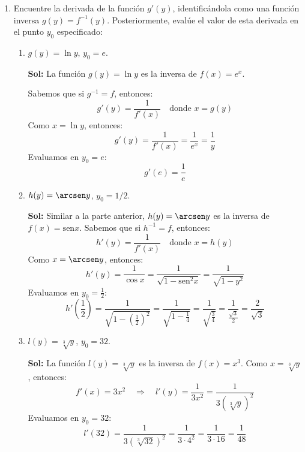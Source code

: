 \documentclass[letterpaper,12pt]{article}
\theoremstyle{plain}
\theoremstyle{definition}
\newcommand{\sen}{\text{sen}}
\begin{document}
\vspace{0.3cm}
\begin{enumerate}

\item Encuentre la derivada de la funci\'on $g'(y)$, identific\'andola como una funci\'on inversa $g(y) = f^{-1}(y)$. Posteriormente, eval\'ue el valor de esta derivada en el punto $y_0$ especificado:
\begin{enumerate}
    \item $g(y) = \ln y$, $y_0 = e$.

\color{blue}
\textbf{Sol:} La función $g(y) = \ln y$ es la inversa de $f(x) = e^x$.

    Sabemos que si $g^{-1} = f$, entonces:
    \[
    g'(y) = \frac{1}{f'(x)} \quad \text{donde } x = g(y)
    \]
    Como $x = \ln y$, entonces:
    \[
    g'(y) = \frac{1}{f'(x)} = \frac{1}{e^x} = \frac{1}{y}
    \]
    Evaluamos en $y_0 = e$:
    \[
    g'(e) = \frac{1}{e}
    \]
\color{black}
    \item $h(y) = \arcsen y$, $y_0 = 1/2$.

\color{blue}
\textbf{Sol:} Similar a la parte anterior, $h(y) = \arcsen y$ es la inversa de $f(x) = \sen x$. Sabemos que si $h^{-1} = f$, entonces:
\[
h'(y) = \frac{1}{f'(x)} \quad \text{donde } x = h(y)
\]
Como $x = \arcsen y$, entonces:
\[
h'(y) = \frac{1}{\cos x} = \frac{1}{\sqrt{1 - \sen^2 x}} = \frac{1}{\sqrt{1 - y^2}}
\]
Evaluamos en $y_0 = \frac{1}{2}$:
\[
h'\left( \frac{1}{2} \right) = \frac{1}{\sqrt{1 - \left( \frac{1}{2} \right)^2}} = \frac{1}{\sqrt{1 - \frac{1}{4}}} = \frac{1}{\sqrt{\frac{3}{4}}} = \frac{1}{\frac{\sqrt{3}}{2}} = \frac{2}{\sqrt{3}}
\]
\color{black}
    
    \item $l(y) = \sqrt[3]{y}$, $y_0 = 32$.

\color{blue}
\textbf{Sol:}
La función $l(y) = \sqrt[3]{y}$ es la inversa de $f(x) = x^3$. Como $x = \sqrt[3]{y}$, entonces:
\[
f'(x) = 3x^2 \quad \Rightarrow \quad l'(y) = \frac{1}{3x^2} = \frac{1}{3 (\sqrt[3]{y})^2}
\]
Evaluamos en $y_0 = 32$:
\[
l'(32) = \frac{1}{3 (\sqrt[3]{32})^2} = \frac{1}{3 \cdot 4^2} = \frac{1}{3 \cdot 16} = \frac{1}{48}
\]
\color{black}
    

\end{enumerate}
\end{enumerate}
\end{document}
